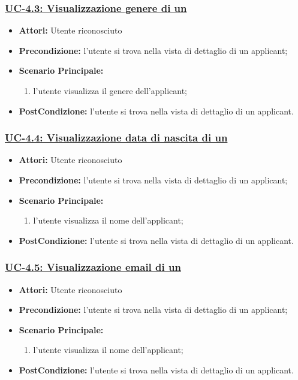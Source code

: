 \subsubsection{\underline{UC-4.3: Visualizzazione genere di un \applicant}}
\begin{itemize}
	\item \textbf{Attori:} Utente riconosciuto
	\item \textbf{Precondizione:} l'utente si trova nella vista di dettaglio di un applicant;
	\item \textbf{Scenario Principale:}
	\begin{enumerate} 
		\item l'utente visualizza il genere dell'applicant;
	\end{enumerate}
	\item \textbf{PostCondizione:} l'utente si trova nella vista di dettaglio di un applicant.
\end{itemize}

\subsubsection{\underline{UC-4.4: Visualizzazione data di nascita di un \applicant}}
\begin{itemize}
	\item \textbf{Attori:} Utente riconosciuto
	\item \textbf{Precondizione:} l'utente si trova nella vista di dettaglio di un applicant;
	\item \textbf{Scenario Principale:}
	\begin{enumerate} 
		\item l'utente visualizza il nome dell'applicant;
	\end{enumerate}
	\item \textbf{PostCondizione:} l'utente si trova nella vista di dettaglio di un applicant.
\end{itemize}

\subsubsection{\underline{UC-4.5: Visualizzazione email di un \applicant}}
\begin{itemize}
	\item \textbf{Attori:} Utente riconosciuto
	\item \textbf{Precondizione:} l'utente si trova nella vista di dettaglio di un applicant;
	\item \textbf{Scenario Principale:}
	\begin{enumerate} 
		\item l'utente visualizza il nome dell'applicant;
	\end{enumerate}
	\item \textbf{PostCondizione:} l'utente si trova nella vista di dettaglio di un applicant.
\end{itemize}

